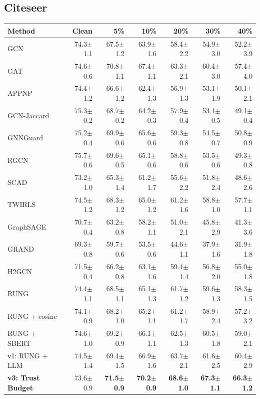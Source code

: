 \documentclass{article}
\newcommand{\score}[2]{#1{\scriptsize$\pm$#2}}
\begin{document}
\subsection{Citeseer}
\begin{center}
\scriptsize
\begin{tabular}{lrrrrrr}
\toprule
Method & Clean & 5\% & 10\% & 20\% & 30\% & 40\% \\
\midrule
GCN & \score{74.3}{1.1} & \score{67.5}{1.2} & \score{63.9}{1.6} & \score{58.4}{2.2} & \score{54.9}{3.0} & \score{52.2}{3.9} \\
GAT & \score{74.6}{0.6} & \score{70.8}{1.1} & \score{67.4}{1.1} & \score{63.3}{2.1} & \score{60.4}{3.0} & \score{57.4}{4.0} \\
APPNP & \score{74.4}{1.2} & \score{66.6}{1.2} & \score{62.4}{1.3} & \score{56.9}{1.3} & \score{53.1}{1.9} & \score{50.1}{2.1} \\
GCN-Jaccard & \score{75.3}{0.2} & \score{68.7}{0.2} & \score{64.2}{0.3} & \score{57.9}{0.4} & \score{53.1}{0.5} & \score{49.1}{0.4} \\
GNNGuard & \score{75.2}{0.4} & \score{69.9}{0.6} & \score{65.6}{0.6} & \score{59.3}{0.8} & \score{54.5}{0.7} & \score{50.8}{0.9} \\
RGCN & \score{75.7}{0.6} & \score{69.6}{0.5} & \score{65.1}{0.6} & \score{58.8}{0.6} & \score{53.5}{0.6} & \score{49.3}{0.8} \\
SCAD & \score{73.2}{1.0} & \score{65.3}{1.4} & \score{61.2}{1.7} & \score{55.6}{2.2} & \score{51.8}{2.4} & \score{48.6}{2.6} \\
TWIRLS & \score{74.5}{1.2} & \score{68.3}{1.2} & \score{65.0}{1.2} & \score{61.2}{1.6} & \score{58.8}{1.0} & \score{57.7}{1.1} \\
GraphSAGE & \score{70.7}{0.4} & \score{63.2}{0.8} & \score{58.2}{1.1} & \score{51.0}{2.1} & \score{45.8}{2.9} & \score{41.3}{3.6} \\
GRAND & \score{69.3}{0.8} & \score{59.7}{0.6} & \score{53.5}{0.6} & \score{44.6}{1.1} & \score{37.9}{1.6} & \score{31.9}{1.8} \\
H2GCN & \score{71.5}{0.4} & \score{66.2}{0.8} & \score{63.1}{1.6} & \score{59.4}{1.4} & \score{56.8}{2.0} & \score{55.0}{1.8} \\
RUNG & \score{74.4}{1.1} & \score{68.5}{1.1} & \score{65.1}{1.3} & \score{61.7}{1.2} & \score{59.6}{1.3} & \score{58.3}{1.5} \\
RUNG + cosine & \score{74.1}{0.9} & \score{68.2}{1.0} & \score{65.2}{1.1} & \score{61.2}{1.7} & \score{58.9}{2.4} & \score{57.2}{3.2} \\
RUNG + SBERT & \score{74.6}{1.0} & \score{69.2}{0.9} & \score{66.1}{1.1} & \score{62.5}{1.3} & \score{60.5}{1.8} & \score{59.0}{2.1} \\
v1: RUNG + LLM & \score{74.5}{1.4} & \score{69.4}{1.5} & \score{66.9}{1.6} & \score{63.7}{2.1} & \score{61.6}{2.5} & \score{60.4}{2.9} \\
\textbf{v3: Trust Budget} & \score{73.6}{0.9} & \textbf{\score{71.5}{0.9}} & \textbf{\score{70.2}{0.9}} & \textbf{\score{68.6}{1.0}} & \textbf{\score{67.3}{1.1}} & \textbf{\score{66.3}{1.2}} \\
\bottomrule
\end{tabular}
\end{center}
\end{document}
